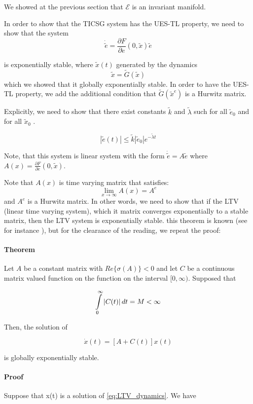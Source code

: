 \documentclass[letterpaper, 10 pt, conference]{ieeeconf}  %
\begin{document}
We showed at the previous section that $\mathscr{E}$ is an invariant manifold. 

In order to show that the TICSG system has the  UES-TL property, we need to show that the system  
$$
\dot{\tilde{e}}=\frac{\partial F}{\partial e}(0,\tilde{x})\tilde{e}
$$

is exponentially stable, where $\tilde{x}(t)$ generated by the dynamics 
$$
\tilde{x}=\tilde{G}(\tilde{x})
$$
 which we showed that it globally exponentially stable.
In order to have the UES-TL property, we  add the additional condition  that $\tilde{G}(\tilde{x}^e)$
is a Hurwitz matrix.

 Explicitly, we need to show that there exist constants $\tilde{k}$
and $\tilde{\lambda}$ such for all $\tilde{e}_0$ and for all
$\tilde{x}_0$ .

$$
\left| \tilde{e}(t)\right|\leq \tilde{k}\left| \tilde{e}_{0}\right|  e^{-\tilde{\lambda} t}
$$

Note, that this system is linear system with the form $
\dot{\tilde{e}}=A\tilde{e}
$ where  $A\left(x\right)=\frac{\partial F}{\partial e}(0,\tilde{x})$.


Note that $A\left(x \right)$ is time varying matrix that satisfies: 
$$\lim_{x \to \infty} A\left(x \right) = A^e$$
and $A^e$ is a Hurwitz matrix.
In other words, we need to show that if the LTV (linear time varying system),
which it matrix converges exponentially to a stable matrix, then the
LTV system is exponentially stable. this theorem is known (see for instance \cite{SchovanecGilliam1999}),
but for the clearance of the reading, we  repeat the proof:
\paragraph{Theorem}
Let $A$ be a constant matrix with $Re\{\sigma(A)\}<0$ and let $C$
be a continuous matrix valued function on the function on the interval
$[0,\infty)$. Supposed that 

\[
\intop_{0}^{\infty}\left|C(t)\right|dt=M<\infty
\]

Then, the solution of 

\begin{equation}
\dot{x}(t)=[A+C(t)]x(t)\label{eq:LTV_dynamics}
\end{equation}

is globally exponentially stable.

\paragraph{Proof}
Suppose that x(t) is a solution of \eqref{eq:LTV_dynamics}.
We have 
\end{document}
